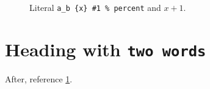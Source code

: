 \documentclass{article}
\begin{document}
\begin{figure}
\cprotect\caption[Short \verb|a_b|]{Literal \verb|a_b {x} #1 % percent| and $x+1$.}
\label{fig:literal}
\end{figure}
\cprotect[m]\section{Heading with \verb*|two words|}
After, reference \ref{fig:literal}.
\end{document}
